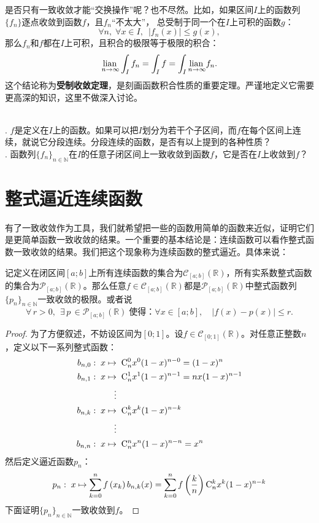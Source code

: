 \documentclass[12pt,UTF8]{ctexbook}
\begin{document}
\begin{appendix}
是否只有一致收敛才能“交换操作”呢？也不尽然。比如，如果区间$I$上的函数列$\{f_n\}$逐点收敛到函数$f$，且$f_n$“不太大”，
总受制于同一个在$I$上可积的函数$g$：
$$ \forall n, \; \forall x \in I,\,\,\, |f_n(x)| \leqslant g(x), $$
那么$f_n$和$f$都在$I$上可积，且积合的极限等于极限的积合：
$$ \underset{n\to\infty}{\operatorname{lian}\,} \int_I f_n = \int_I f = \int_I \underset{n\to\infty}{\operatorname{lian}\,} f_n. $$
这个结论称为\textbf{受制收敛定理}，是刻画函数积合性质的重要定理。严谨地定义它需要更高深的知识，这里不做深入讨论。

\begin{sk}
    \mbox{} \\
    . $f$是定义在$I$上的函数。如果可以把$I$划分为若干个子区间，而$f$在每个区间上连续，就说它分段连续。分段连续的函数，是否有以上提到的各种性质？\\
    . 函数列$\{f_n\}_{n\in\mathbb{N}}$在$I$的任意子闭区间上一致收敛到函数$f$，它是否在$I$上收敛到$f$？
\end{sk}

\section{整式逼近连续函数}

有了一致收敛作为工具，我们就希望把一些的函数用简单的函数来近似，证明它们是更简单函数一致收敛的结果。一个重要的基本结论是：连续函数可以看作整式函数一致收敛的结果。我们把这个现象称为连续函数的整式逼近。具体来说：

\begin{tm}
    记定义在闭区间$[a;b]$上所有连续函数的集合为$\mathcal{C}_{[a;b]}(\mathbb{R})$，所有实系数整式函数的集合为$\mathcal{P}_{[a;b]}(\mathbb{R})$。那么任意$f\in\mathcal{C}_{[a;b]}(\mathbb{R})$都是$\mathcal{P}_{[a;b]}(\mathbb{R})$中整式函数列$\{p_n\}_{n\in\mathbb{N}}$一致收敛的极限。或者说
    \[ \forall \, r > 0, \;\, \exists \, p \, \in \mathcal{P}_{[a;b]}(\mathbb{R}) \; \mbox{使得：} \forall x\in [a;b],\quad \left| f(x) - p(x) \right| \leqslant r.\]
\end{tm}

\begin{proof}
    为了方便叙述，不妨设区间为$[0;1]$。设$f\in\mathcal{C}_{[0;1]}(\mathbb{R})$。对任意正整数$n$，定义以下一系列整式函数：
    \begin{align*}
        b_{n,0}:\; x &\mapsto \;\mathrm{C}_{n}^{0} x^0(1 - x)^{n-0} = (1 - x)^{n} \\
        b_{n,1}:\; x &\mapsto \;\mathrm{C}_{n}^{1} x^1(1 - x)^{n-1} = nx(1 - x)^{n-1} \\
        &\quad \vdots \\
        b_{n,k}:\; x &\mapsto \;\mathrm{C}_{n}^{k} x^k(1 - x)^{n-k} \\
        &\quad \vdots \\
        b_{n,n}:\; x &\mapsto \;\mathrm{C}_{n}^{n} x^n(1 - x)^{n-n} = x^{n} 
    \end{align*}
    然后定义逼近函数$p_n$：
    \begin{align*}
        p_n: \; x\mapsto \sum_{k=0}^n f\left(x_k\right) b_{n,k}(x) = \sum_{k=0}^n f\left(\frac{k}{n}\right) \mathrm{C}_{n}^{k} x^k(1 - x)^{n-k}
    \end{align*}
    下面证明$\{p_n\}_{n\in\mathbb{N}}$一致收敛到$f$。


\end{proof}
\end{appendix}
\end{document}
